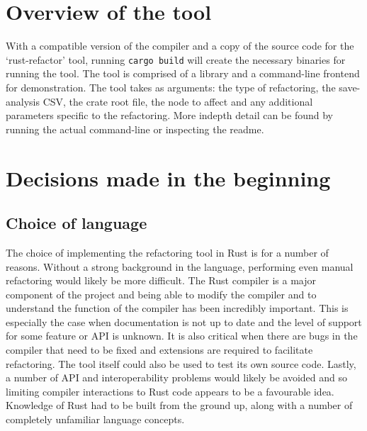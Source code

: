 \section{Overview of the tool}\label{S:iover}
With a compatible version of the compiler and a copy of the source code for the `rust-refactor' tool, running {\verb|cargo build|} will create the necessary binaries for running the tool. The tool is comprised of a library and a command-line frontend for demonstration. The tool takes as arguments: the type of refactoring, the save-analysis CSV, the crate root file, the node to affect and any additional parameters specific to the refactoring. More indepth detail can be found by running the actual command-line or inspecting the readme.

\section{Decisions made in the beginning}\label{S:begin}
\subsection{Choice of language}
The choice of implementing the refactoring tool in Rust is for a number of reasons. Without a strong background in the language, performing even manual refactoring would likely be more difficult. The Rust compiler is a major component of the project and being able to modify the compiler and to understand the function of the compiler has been incredibly important. This is especially the case when documentation is not up to date and the level of support for some feature or API is unknown. It is also critical when there are bugs in the compiler that need to be fixed and extensions are required to facilitate refactoring. The tool itself could also be used to test its own source code. Lastly, a number of API and interoperability problems would likely be avoided and so limiting compiler interactions to Rust code appears to be a favourable idea. Knowledge of Rust had to be built from the ground up, along with a number of completely unfamiliar language concepts.


